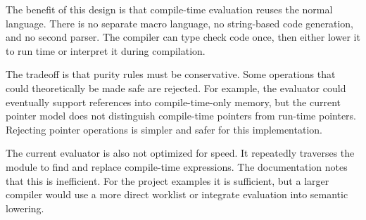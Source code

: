 The benefit of this design is that compile-time evaluation reuses the normal
language. There is no separate macro language, no string-based code generation,
and no second parser. The compiler can type check code once, then either lower
it to run time or interpret it during compilation.

The tradeoff is that purity rules must be conservative. Some operations that
could theoretically be made safe are rejected. For example, the evaluator could
eventually support references into compile-time-only memory, but the current
pointer model does not distinguish compile-time pointers from run-time pointers.
Rejecting pointer operations is simpler and safer for this implementation.

The current evaluator is also not optimized for speed. It repeatedly traverses
the module to find and replace compile-time expressions. The documentation notes
that this is inefficient. For the project examples it is sufficient, but a
larger compiler would use a more direct worklist or integrate evaluation into
semantic lowering.
